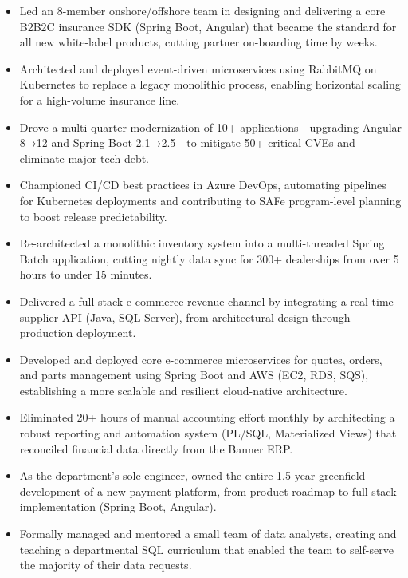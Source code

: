\begin{itemize}
    \item Led an 8-member onshore/offshore team in designing and delivering a core B2B2C insurance SDK (Spring Boot, Angular) that became the standard for all new white-label products, cutting partner on-boarding time by weeks.
    \item Architected and deployed event-driven microservices using RabbitMQ on Kubernetes to replace a legacy monolithic process, enabling horizontal scaling for a high-volume insurance line.
    \item Drove a multi-quarter modernization of 10+ applications—upgrading Angular 8→12 and Spring Boot 2.1→2.5—to mitigate 50+ critical CVEs and eliminate major tech debt.
    \item Championed CI/CD best practices in Azure DevOps, automating pipelines for Kubernetes deployments and contributing to SAFe program-level planning to boost release predictability.
\end{itemize}
\vspace{\spacingBetweenJobs}

\begin{itemize}
    \item Re-architected a monolithic inventory system into a multi-threaded Spring Batch application, cutting nightly data sync for 300+ dealerships from over 5 hours to under 15 minutes.
    \item Delivered a full-stack e-commerce revenue channel by integrating a real-time supplier API (Java, SQL Server), from architectural design through production deployment.
    \item Developed and deployed core e-commerce microservices for quotes, orders, and parts management using Spring Boot and AWS (EC2, RDS, SQS), establishing a more scalable and resilient cloud-native architecture.
\end{itemize}
\vspace{\spacingBetweenJobs}

\begin{itemize}
    \item Eliminated 20+ hours of manual accounting effort monthly by architecting a robust reporting and automation system (PL/SQL, Materialized Views) that reconciled financial data directly from the Banner ERP.
    \item As the department's sole engineer, owned the entire 1.5-year greenfield development of a new payment platform, from product roadmap to full-stack implementation (Spring Boot, Angular).
    \item Formally managed and mentored a small team of data analysts, creating and teaching a departmental SQL curriculum that enabled the team to self-serve the majority of their data requests.
\end{itemize}
\vspace{\spacingBetweenJobs}

